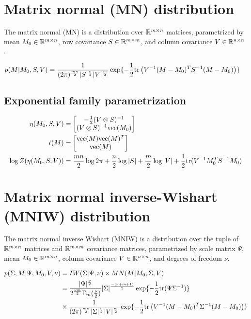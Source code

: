 \section{Matrix normal (MN) distribution}
\label{sec:stats-mn}

The matrix normal (MN) is 
a distribution over $\mathbb{R}^{m \times n}$
matrices, parametrized by 
mean $M_0 \in \mathbb{R}^{m \times n}$,
row covariance $S \in \mathbb{R}^{m \times m}$,
and column covariance $V \in \mathbb{R}^{n \times n}$ .


\begin{align}
        p(M | M_0, S, V) &= \frac{1}{(2\pi)^{\frac{mn}{2}}|S|^{\frac{n}{2}}|V|^{\frac{m}{2}}} \exp{-\frac{1}{2}\tr\left(V^{-1}(M - M_0)^TS^{-1}(M - M_0)\right)}
\end{align}

\subsection{Exponential family parametrization}
\begin{align*}
    \eta(M_0, S, V) &= \begin{bmatrix}-\frac{1}{2}(V \otimes S)^{-1}\\(V \otimes S)^{-1}\mathrm{vec}(M_0)\end{bmatrix} \\
    t(M) &= \begin{bmatrix}\mathrm{vec}(M)\mathrm{vec}(M)^T\\\mathrm{vec}(M)\end{bmatrix} \\
    \log Z(\eta(M_0, S, V)) &= \frac{mn}{2}\log 2\pi + \frac{n}{2}\log|S| + \frac{m}{2}\log|V| + \frac{1}{2}\mathrm{tr}(V^{-1}M_0^TS^{-1}M_0) 
\end{align*}

\section{Matrix normal inverse-Wishart (MNIW) distribution}
\label{sec:stats-mniw}

The matrix normal inverse Wishart (MNIW) is 
a distribution over the tuple of $\mathbb{R}^{m \times n}$
matrices and $\mathbb{R}^{m \times m}$ covariance matrices, parametrized by 
scale matrix $\Psi$,
mean $M_0 \in \mathbb{R}^{m \times n}$,
column covariance $V \in \mathbb{R}^{n \times n}$,
and degrees of freedom $\nu$.


\begin{align}
        p(\Sigma, M | \Psi, M_0, V, \nu) &= \IW(\Sigma|\Psi, \nu) \times \MN(M|M_0, \Sigma, V) \\
        &= \frac{|\Psi|^{\frac{\nu}{2}}}{2^{\frac{\nu m}{2}}\Gamma_m(\frac{\nu}{2})}|\Sigma|^{\frac{-(\nu + m + 1)}{2}} \exp {-\frac{1}{2}\tr(\Psi\Sigma^{-1})} \\
        &\times \frac{1}{(2\pi)^{\frac{mn}{2}}|\Sigma|^{\frac{n}{2}}|V|^{\frac{m}{2}}} \exp{-\frac{1}{2}\tr\left(V^{-1}(M - M_0)^T\Sigma^{-1}(M - M_0)\right)}
\end{align}

